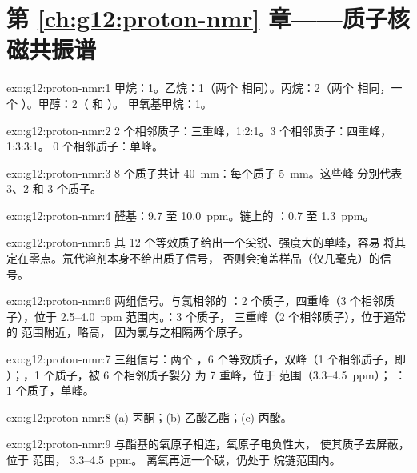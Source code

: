 \section*{第 \ref{ch:g12:proton-nmr} 章——质子核磁共振谱}

\begin{solution}{exo:g12:proton-nmr:1}
甲烷：1。乙烷：1（两个  相同）。丙烷：2（两个
 相同，一个 ）。甲醇：2（ 和 ）。
甲氧基甲烷：1。
\end{solution}

\begin{solution}{exo:g12:proton-nmr:2}
2 个相邻质子：三重峰，1:2:1。3 个相邻质子：四重峰，1:3:3:1。
0 个相邻质子：单峰。
\end{solution}

\begin{solution}{exo:g12:proton-nmr:3}
8 个质子共计 \qty{40}{mm}：每个质子 \qty{5}{mm}。这些峰
分别代表 3、2 和 3 个质子。
\end{solution}

\begin{solution}{exo:g12:proton-nmr:4}
醛基：9.7 至 \qty{10.0}{ppm}。链上的 ：0.7 至
\qty{1.3}{ppm}。
\end{solution}

\begin{solution}{exo:g12:proton-nmr:5}
其 12 个等效质子给出一个尖锐、强度大的单峰，容易
将其定在零点。氘代溶剂本身不给出质子信号，
否则会掩盖样品（仅几毫克）的信号。
\end{solution}

\begin{solution}{exo:g12:proton-nmr:6}
两组信号。与氯相邻的 ：2 个质子，四重峰（3
个相邻质子），位于 2.5--\qty{4.0}{ppm} 范围内。：3 个质子，
三重峰（2 个相邻质子），位于通常的  范围附近，略高，
因为氯与之相隔两个原子。
\end{solution}

\begin{solution}{exo:g12:proton-nmr:7}
三组信号：两个 ，6 个等效质子，双峰（1
个相邻质子，即 ）；，1 个质子，被 6 个相邻质子裂分
为 7 重峰，位于  范围（3.3--\qty{4.5}{ppm}）；
：1 个质子，单峰。
\end{solution}

\begin{solution}{exo:g12:proton-nmr:8}
(a) 丙酮；(b) 乙酸乙酯；(c) 丙酸。
\end{solution}

\begin{solution}{exo:g12:proton-nmr:9}
 与酯基的氧原子相连，氧原子电负性大，
使其质子去屏蔽，位于  范围，
3.3--\qty{4.5}{ppm}。 离氧再远一个碳，仍处于
烷链范围内。
\end{solution}


